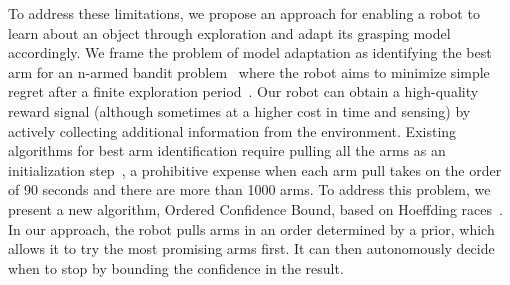 \documentclass{article}
\newcommand{\algorithmCTxt}{Ordered Confidence Bound}
\begin{document}
To address these limitations, we propose an approach for enabling a
robot to learn about an object through exploration and adapt its
grasping model accordingly.  We frame the problem of model adaptation
as identifying the best arm for an n-armed bandit
problem~\citep{thompson33} where the robot aims to minimize simple
regret after a finite exploration period~\citep{bubeck09}.  Our robot
can obtain a high-quality reward signal (although sometimes at a
higher cost in time and sensing) by actively collecting additional
information from the environment.  Existing algorithms for best arm
identification require pulling all the arms as an initialization
step~\citep{mannor04, audibert10, chen14}, a prohibitive expense when
each arm pull takes on the order of 90 seconds and there are more than
1000 arms.  To address this problem, we present a new algorithm,
\algorithmCTxt, based on Hoeffding races~\citep{maron93}. In our
approach, the robot pulls arms in an order determined by a prior,
which allows it to try the most promising arms first. It can then
autonomously decide when to stop by bounding the confidence in the
result.


\end{document}
